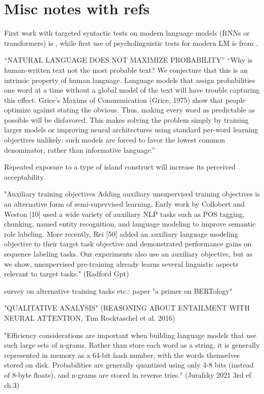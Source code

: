 \section{Misc notes with refs}


First work with targeted syntactic tests on modern language models (RNNs or transformers) is \citet{linzen2016assessing}, while first use of psycholinguistic tests for modern LM is from \citet{futrell2018rnns}.

“NATURAL LANGUAGE DOES NOT MAXIMIZE PROBABILITY” 
“Why is human-written text not the most probable text? We conjecture that this is an intrinsic property of human language. Language models that assign probabilities one word at a time without a global model of the text will have trouble capturing this effect. Grice’s Maxims of Communication (Grice, 1975) show that people optimize against stating the obvious. Thus, making every word as predictable as possible will be disfavored. This makes solving the problem simply by training larger models or improving neural architectures using standard per-word learning objectives unlikely: such models are forced to favor the lowest common denominator, rather than informative language.” 
\citep{holtzman2019curious}

Repeated exposure to a type of island construct will increase its perceived acceptability 
\citep{chaves2014subject}



"Auxiliary training objectives Adding auxiliary unsupervised training objectives is an alternative form of semi-supervised learning. Early work by Collobert and Weston [10] used a wide variety of auxiliary NLP tasks such as POS tagging, chunking, named entity recognition, and language modeling to improve semantic role labeling. More recently, Rei [50] added an auxiliary language modeling objective to their target task objective and demonstrated performance gains on sequence labeling tasks. Our experiments also use an auxiliary objective, but as we show, unsupervised pre-training already learns several linguistic aspects relevant to target tasks." (Radford Gpt)

survey on alternative training tasks etc.: paper "a primer on BERTology"

"QUALITATIVE ANALYSIS" (REASONING ABOUT ENTAILMENT WITH NEURAL ATTENTION, Tim Rocktaschel et al. 2016)

"Efficiency considerations are important when building language models that use
such large sets of n-grams. Rather than store each word as a string, it is generally
represented in memory as a 64-bit hash number, with the words themselves stored
on disk. Probabilities are generally quantized using only 4-8 bits (instead of 8-byte floats), and n-grams are stored in reverse tries." (Jurafsky 2021 3rd ef ch.3)

